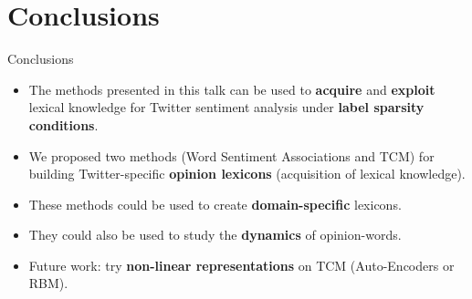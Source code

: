 \documentclass[handout]{beamer}
\begin{document}
\begin{frame}{ASA results}
\begin{table}[htb]
bold. }
\label{tab:resA}
\end{table} 
 
 
\end{frame}




\section{Conclusions}

\begin{frame}{Conclusions}
\begin{scriptsize}
\begin{itemize}
\item The methods presented in this talk can be used to \textbf{acquire} and \textbf{exploit} lexical knowledge for Twitter sentiment analysis under \textbf{label sparsity conditions}. 

\item We proposed two methods (Word Sentiment Associations and TCM) for building Twitter-specific \textbf{opinion lexicons} (acquisition of lexical knowledge).

\item These methods could be used to create \textbf{domain-specific} lexicons.
\item They could also be used to study the \textbf{dynamics} of opinion-words.
\item Future work: try \textbf{non-linear representations} on TCM (Auto-Encoders or RBM).

\end{itemize}
\end{scriptsize}

\end{frame}
\end{document}
